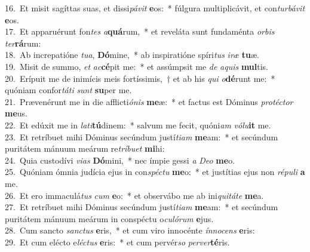{16.~}Et misit sagíttas suas, et dissi\textit{pá}\textit{vit} \textbf{e}os:~* fúlgura multiplicávit, et con\textit{tur}\textit{bá}\textit{vit} \textbf{e}os.\\
{17.~}Et apparuérunt fon\textit{tes} \textit{a}\textbf{quá}rum,~* et reveláta sunt fundaménta \textit{or}\textit{bis} \textit{ter}\textbf{rá}rum:\\
{18.~}Ab increpatióne \textit{tu}\textit{a}, \textbf{Dó}mine,~* ab inspiratióne spíri\textit{tus} \textit{i}\textit{ræ} \textbf{tu}æ.\\
{19.~}Misit de summo, \textit{et} \textit{ac}\textbf{cé}pit me:~* et assúmpsit me \textit{de} \textit{a}\textit{quis} \textbf{mul}tis.\\
{20.~}Erípuit me de inimícis meis fortíssimis,~† et ab his \textit{qui} \textit{o}\textbf{dé}runt me:~* quóniam confor\textit{tá}\textit{ti} \textit{sunt} \textbf{su}per me.\\
{21.~}Prævenérunt me in die afflicti\textit{ó}\textit{nis} \textbf{me}æ:~* et factus est Dóminus \textit{pro}\textit{té}\textit{ctor} \textbf{me}us.\\
{22.~}Et edúxit me in \textit{la}\textit{ti}\textbf{tú}dinem:~* salvum me fecit, quóni\textit{am} \textit{vó}\textit{lu}\textbf{it} me.\\
{23.~}Et retríbuet mihi Dóminus secúndum justí\textit{ti}\textit{am} \textbf{me}am:~* et secúndum puritátem mánuum meárum re\textit{trí}\textit{bu}\textit{et} \textbf{mi}hi:\\
{24.~}Quia custodívi \textit{vi}\textit{as} \textbf{Dó}mini,~* nec ímpie gessi \textit{a} \textit{De}\textit{o} \textbf{me}o.\\
{25.~}Quóniam ómnia judícia ejus in con\textit{spé}\textit{ctu} \textbf{me}o:~* et justítias ejus non \textit{ré}\textit{pu}\textit{li} \textbf{a} me.\\
{26.~}Et ero immaculá\textit{tus} \textit{cum} \textbf{e}o:~* et observábo me ab ini\textit{qui}\textit{tá}\textit{te} \textbf{me}a.\\
{27.~}Et retríbuet mihi Dóminus secúndum justí\textit{ti}\textit{am} \textbf{me}am:~* et secúndum puritátem mánuum meárum in conspéctu o\textit{cu}\textit{ló}\textit{rum} \textbf{e}jus.\\
{28.~}Cum sancto \textit{san}\textit{ctus} \textbf{e}ris,~* et cum viro innocénte \textit{ín}\textit{no}\textit{cens} \textbf{e}ris:\\
{29.~}Et cum elécto e\textit{lé}\textit{ctus} \textbf{e}ris:~* et cum pervér\textit{so} \textit{per}\textit{ver}\textbf{té}ris.\\
